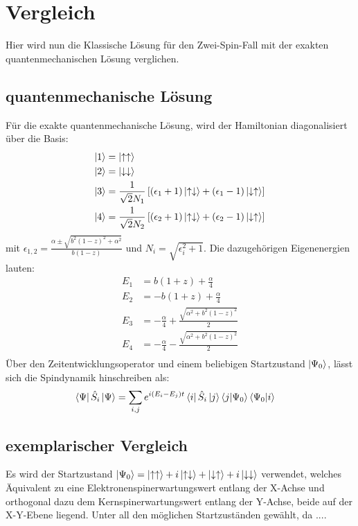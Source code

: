 \chapter{Vergleich}
Hier wird nun die Klassische Lösung für den Zwei-Spin-Fall mit der exakten quantenmechanischen Lösung verglichen.
\section{quantenmechanische Lösung}
Für die exakte quantenmechanische Lösung, wird der Hamiltonian diagonalisiert über die Basis:
\begin{align}
    \ket{1} &= \ket{\uparrow\uparrow}   \\
    \ket{2} &= \ket{\downarrow\downarrow} \\
    \ket{3} &= \frac{1}{\sqrt{2}N_1}\left[(\epsilon_1+1)\ket{\uparrow\downarrow} +(\epsilon_1-1)\ket{\downarrow\uparrow} \right]\\
    \ket{4} &= \frac{1}{\sqrt{2}N_2}\left[(\epsilon_2+1)\ket{\uparrow\downarrow} +(\epsilon_2-1)\ket{\downarrow\uparrow} \right]
\end{align}
mit $\epsilon_{1,2} = \frac{\alpha \pm \sqrt{b^2(1-z)^2+\alpha^2} }{b(1-z)} $ und $N_{i} = \sqrt{\epsilon_i^2 + 1}$. Die dazugehörigen Eigenenergien lauten:
\begin{align}
    E_1 &= b(1+z) + \frac{\alpha}{4}\\
    E_2 &= -b(1+z) + \frac{\alpha}{4}\\
    E_3 &= -\frac{\alpha}{4} + \frac{\sqrt{\alpha^2 + b^2(1-z)^2}}{2}\\
    E_4 &= -\frac{\alpha}{4} - \frac{\sqrt{\alpha^2 + b^2(1-z)^2}}{2}\\
\end{align}
\noindent Über den Zeitentwicklungsoperator und einem beliebigen Startzustand $\ket{\Psi_0}$, lässt sich die Spindynamik hinschreiben als:
\begin{align}
    \bra{\Psi}\hat{S}_i\ket{\Psi} &= \sum_{i,j}e^{i(E_i-E_j)t}\bra{i}\hat{S}_i\ket{j}\bra{j}\ket{\Psi_0}\bra{\Psi_0}\ket{i}
\end{align}
\section{exemplarischer Vergleich}
Es wird der Startzustand $\ket{\Psi_0}=\ket{\uparrow\uparrow} + i\ket{\uparrow\downarrow} + \ket{\downarrow\uparrow} + 
i\ket{\downarrow\downarrow}$ verwendet, welches Äquivalent zu eine Elektronenspinerwartungswert entlang der X-Achse und orthogonal
dazu dem Kernspinerwartungswert entlang der Y-Achse, beide auf der X-Y-Ebene liegend. Unter all den möglichen Startzuständen gewählt,
da ....


